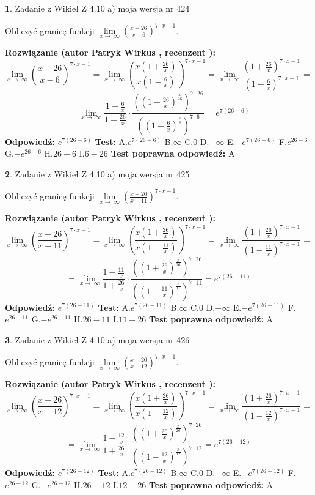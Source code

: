\documentclass[12pt, a4paper]{article}
\theoremstyle{definition} %
\newtheorem{zad}{}
\newcommand{\zadStart}[1]{\begin{zad}#1\newline}
\newcommand{\zadStop}{\end{zad}}
\newcommand{\rozwStart}[2]{\noindent \textbf{Rozwiązanie (autor #1 , recenzent #2): }\newline}
\newcommand{\rozwStop}{\newline}
\newcommand{\odpStart}{\noindent \textbf{Odpowiedź:}\newline}
\newcommand{\odpStop}{\newline}
\newcommand{\testStart}{\noindent \textbf{Test:}\newline}
\newcommand{\testStop}{\newline}
\newcommand{\kluczStart}{\noindent \textbf{Test poprawna odpowiedź:}\newline}
\newcommand{\kluczStop}{\newline}
\begin{document}
\zadStart{Zadanie z Wikieł Z 4.10 a) moja wersja nr 424}


Obliczyć granicę funkcji  $\lim\limits_{x\to\ \infty}(\frac{x+26}{x-6})^{7\cdot x-1}$.
\zadStop
\rozwStart{Patryk Wirkus}{}
$$\lim\limits_{x\to\ \infty}(\frac{x+26}{x-6})^{7\cdot x-1} = \lim\limits_{x\to\ \infty}(\frac{x(1+\frac{26}{x})}{x(1-\frac{6}{x})})^{7\cdot x-1}=\lim\limits_{x\to\ \infty}\frac{(1+\frac{26}{x})^{7\cdot x-1}}{(1-\frac{6}{x})^{7\cdot x-1}}=$$
$$=\lim\limits_{x\to\ \infty}\frac{1-\frac{6}{x}}{1+\frac{26}{x}}\cdot\frac{((1+\frac{26}{x})^{\frac{x}{26}})^{7\cdot26}}{((1-\frac{6}{x})^{\frac{x}{6}})^{7\cdot6}}=e^{7(26-6)}$$
\rozwStop
\odpStart
$e^{7(26-6)}$
\odpStop
\testStart
A.$e^{7(26-6)}$ B.$\infty$ C.$0$ D.$-\infty$ E.$-e^{7(26-6)}$
F.$e^{26-6}$ G.$-e^{26-6}$
H.$26-6$
I.$6-26$
\testStop
\kluczStart
A
\kluczStop



\zadStart{Zadanie z Wikieł Z 4.10 a) moja wersja nr 425}


Obliczyć granicę funkcji  $\lim\limits_{x\to\ \infty}(\frac{x+26}{x-11})^{7\cdot x-1}$.
\zadStop
\rozwStart{Patryk Wirkus}{}
$$\lim\limits_{x\to\ \infty}(\frac{x+26}{x-11})^{7\cdot x-1} = \lim\limits_{x\to\ \infty}(\frac{x(1+\frac{26}{x})}{x(1-\frac{11}{x})})^{7\cdot x-1}=\lim\limits_{x\to\ \infty}\frac{(1+\frac{26}{x})^{7\cdot x-1}}{(1-\frac{11}{x})^{7\cdot x-1}}=$$
$$=\lim\limits_{x\to\ \infty}\frac{1-\frac{11}{x}}{1+\frac{26}{x}}\cdot\frac{((1+\frac{26}{x})^{\frac{x}{26}})^{7\cdot26}}{((1-\frac{11}{x})^{\frac{x}{11}})^{7\cdot11}}=e^{7(26-11)}$$
\rozwStop
\odpStart
$e^{7(26-11)}$
\odpStop
\testStart
A.$e^{7(26-11)}$ B.$\infty$ C.$0$ D.$-\infty$ E.$-e^{7(26-11)}$
F.$e^{26-11}$ G.$-e^{26-11}$
H.$26-11$
I.$11-26$
\testStop
\kluczStart
A
\kluczStop



\zadStart{Zadanie z Wikieł Z 4.10 a) moja wersja nr 426}


Obliczyć granicę funkcji  $\lim\limits_{x\to\ \infty}(\frac{x+26}{x-12})^{7\cdot x-1}$.
\zadStop
\rozwStart{Patryk Wirkus}{}
$$\lim\limits_{x\to\ \infty}(\frac{x+26}{x-12})^{7\cdot x-1} = \lim\limits_{x\to\ \infty}(\frac{x(1+\frac{26}{x})}{x(1-\frac{12}{x})})^{7\cdot x-1}=\lim\limits_{x\to\ \infty}\frac{(1+\frac{26}{x})^{7\cdot x-1}}{(1-\frac{12}{x})^{7\cdot x-1}}=$$
$$=\lim\limits_{x\to\ \infty}\frac{1-\frac{12}{x}}{1+\frac{26}{x}}\cdot\frac{((1+\frac{26}{x})^{\frac{x}{26}})^{7\cdot26}}{((1-\frac{12}{x})^{\frac{x}{12}})^{7\cdot12}}=e^{7(26-12)}$$
\rozwStop
\odpStart
$e^{7(26-12)}$
\odpStop
\testStart
A.$e^{7(26-12)}$ B.$\infty$ C.$0$ D.$-\infty$ E.$-e^{7(26-12)}$
F.$e^{26-12}$ G.$-e^{26-12}$
H.$26-12$
I.$12-26$
\testStop
\kluczStart
A
\kluczStop
\end{document}
